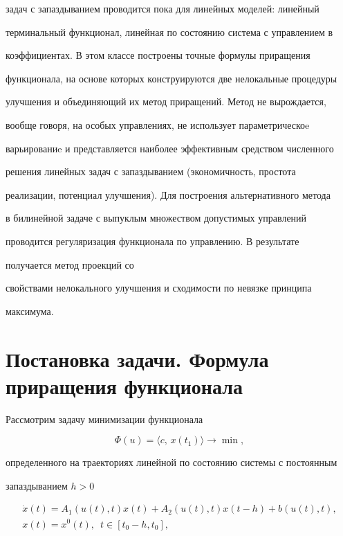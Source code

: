 задач с запаздыванием проводится пока для линейных моделей: линейный


терминальный функционал, линейная по состоянию система с управлением в


коэффициентах. В этом классе построены точные формулы приращения


функционала, на основе которых конструируются две нелокальные процедуры


улучшения и объединяющий их метод приращений. Метод не вырождается,


вообще говоря, на особых управлениях, не использует параметрическоe


варьированиe и представляется наиболее эффективным средством численного


решения линейных задач с запаздыванием (экономичность, простота


реализации, потенциал улучшения). Для построения альтернативного метода


в билинейной задаче с выпуклым множеством допустимых управлений


проводится регуляризация функционала по управлению. В результате


получается метод проекций со


свойствами нелокального улучшения и сходимости по невязке принципа


максимума.





\section{Постановка задачи. Формула приращения функционала}





Рассмотрим задачу минимизации функционала


\begin{equation}


\Phi(u) =\langle c,\,x(t_1)\rangle \rightarrow\min,


\label{eq:z1}


\end{equation}


определенного на траекториях линейной по состоянию системы с постоянным


запаздыванием $h>0$


\begin{equation}


\begin{array}{c}


\Dot{x}(t) = A_1(u(t),t)x(t) + A_2(u(t),t)x(t-h) + b(u(t),t), \\[3mm]


x(t)=x^0(t),\ \;t\in [t_0-h,t_0],


\end{array}


\label{eq:z2}


\end{equation}


